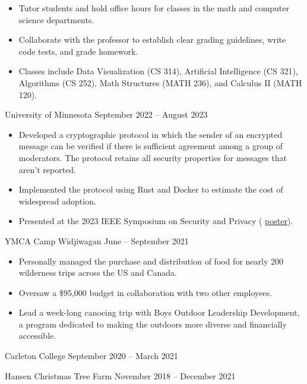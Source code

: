 \documentclass{ali-resume}
\begin{document}
\begin{itemize}
	\item Tutor students and hold office hours for classes in the math and computer science departments.
	\item Collaborate with the professor to establish clear grading guidelines, write code tests, and grade homework.
	\item Classes include
	      Data Visualization (CS 314),
	      Artificial Intelligence (CS 321),
	      Algorithms (CS 252),
	      Math Structures (MATH 236),
	      and Calculus II (MATH 120).
\end{itemize}

{University of Minnesota}
{September 2022 – August 2023}

\begin{itemize}
	\item
	      Developed a cryptographic protocol in which the sender of an encrypted message can be verified if there is sufficient agreement among a group of moderators.
	      The protocol retains all security properties for messages that aren't reported.
	\item Implemented the protocol using Rust and Docker to estimate the cost of widespread adoption.
	\item Presented at the 2023 IEEE Symposium on Security and Privacy (%
	      \href{https://github.com/alipatti/cerberus/blob/master/poster/poster.pdf}{poster}).
\end{itemize}

{YMCA Camp Widjiwagan}
{June – September 2021}

\begin{itemize}
	\item Personally managed the purchase and distribution of food for nearly 200 wilderness trips across the US and Canada.
	\item Oversaw a \$95,000 budget in collaboration with two other employees.
	\item Lead a week-long canoeing trip with Boys Outdoor Leadership Development, a program dedicated to making the outdoors more diverse and financially accessible.
\end{itemize}

{Carleton College}
{September 2020 – March 2021}

{Hansen Christmas Tree Farm}
{November 2018 – December 2021}
\end{document}
